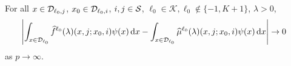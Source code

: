 \begin{lem} \label{lem:vn4}
	For all \(x\in\mathcal{D}_{\ell_0,j}\), \(x_0\in\mathcal{D}_{\ell_0,i}\), \(i,j\in\mathcal{S}\), \(\ell_0\in\mathcal K, \ell_0\notin\{-1,K+1\}\), \(\lambda > 0\),  
	\begin{align}
		&\left|\int_{x\in\mathcal{D}_{\ell_0}}\widehat f^{\ell_0}(\lambda)(x,j;x_0,i)\psi(x) \, \mathrm{d} x - \int_{x\in\mathcal{D}_{\ell_0}}\widehat \mu^{\ell_0}(\lambda)( x,j; x_0,i)\psi(x) \, \mathrm{d} x\right|\to 0  \label{eqn: akhv}
	\end{align}
	as \(p\to\infty\). 
\end{lem}
